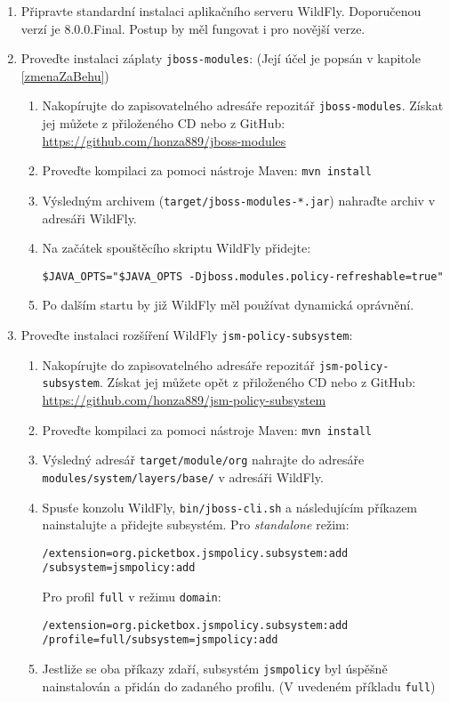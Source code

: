 \begin{enumerate}
  \item Připravte standardní instalaci aplikačního serveru WildFly. Doporučenou verzí je 8.0.0.Final. Postup by měl fungovat i pro novější verze.
  
  \item Proveďte instalaci záplaty {\tt jboss-modules}: (Její účel je popsán v kapitole \ref{zmenaZaBehu})
  \begin{enumerate}
    \item Nakopírujte do zapisovatelného adresáře repozitář {\tt jboss-modules}. Získat jej můžete z přiloženého CD nebo z GitHub:
      \newline\url{https://github.com/honza889/jboss-modules}
    \item Proveďte kompilaci za pomoci nástroje Maven: {\tt mvn install}
    \item Výsledným archivem ({\tt target/jboss-modules-*.jar}) nahraďte archiv  v adresáři WildFly.
    \item Na začátek spouštěcího skriptu WildFly přidejte:
      \begin{lstlisting}
$JAVA_OPTS="$JAVA_OPTS -Djboss.modules.policy-refreshable=true"
      \end{lstlisting}
    \item Po dalším startu by již WildFly měl používat dynamická oprávnění.
  \end{enumerate}
  
  \item Proveďte instalaci rozšíření WildFly {\tt jsm-policy-subsystem}:
  \begin{enumerate}
    \item Nakopírujte do zapisovatelného adresáře repozitář {\tt jsm-policy-subsystem}. Získat jej můžete opět z přiloženého CD nebo z GitHub:
      \newline\url{https://github.com/honza889/jsm-policy-subsystem}
    \item Proveďte kompilaci za pomoci nástroje Maven: {\tt mvn install}
    \item Výsledný adresář {\tt target/module/org} nahrajte do adresáře {\tt modules/system/la\linebreak yers/base/} v adresáři WildFly.
    \item Spusťe konzolu WildFly, {\tt bin/jboss-cli.sh} a následujícím příkazem nainstalujte a přidejte subsystém. Pro {\it standalone} režim:
      \begin{lstlisting}
/extension=org.picketbox.jsmpolicy.subsystem:add
/subsystem=jsmpolicy:add
      \end{lstlisting}
      Pro profil {\tt full} v režimu {\tt domain}:
      \begin{lstlisting}
/extension=org.picketbox.jsmpolicy.subsystem:add
/profile=full/subsystem=jsmpolicy:add
      \end{lstlisting}
    \item Jestliže se oba příkazy zdaří, subsystém {\tt jsmpolicy} byl úspěšně nainstalován a přidán do zadaného profilu. (V uvedeném příkladu {\tt full})
  \end{enumerate}
  

\end{enumerate}
